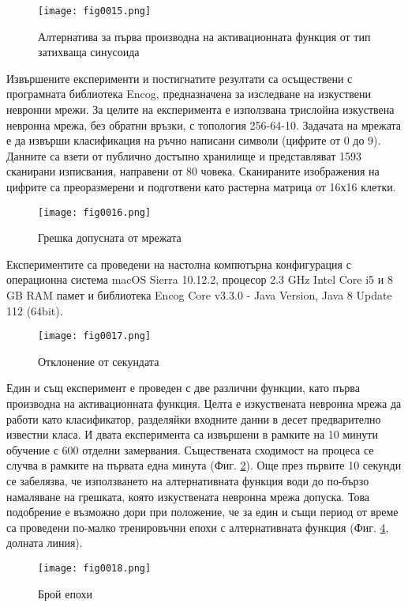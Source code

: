 \begin{figure}[H]
  \centering
  \texttt{[image: fig0015.png]}
  \caption{Алтернатива за първа производна на активационната функция от тип затихваща синусоида}
\label{fig0015}
\end{figure}

Извършените експерименти и постигнатите резултати са осъществени с програмната библиотека Encog, предназначена за изследване на изкуствени невронни мрежи. За целите на експеримента е използвана трислойна изкуствена невронна мрежа, без обратни връзки, с топология 256-64-10. Задачата на мрежата е да извърши класификация на ръчно написани символи (цифрите от 0 до 9). Данните са взети от публично достъпно хранилище и представляват 1593 сканирани изписвания, направени от 80 човека. Сканираните изображения на цифрите са преоразмерени и подготвени като растерна матрица от 16х16 клетки.

\begin{figure}[H]
  \centering
  \texttt{[image: fig0016.png]}
  \caption{Грешка допусната от мрежата}
\label{fig0016}
\end{figure}

Експериментите са проведени на настолна компютърна конфигурация с операционна система macOS Sierra 10.12.2, процесор 2.3 GHz Intel Core i5 и 8 GB RAM памет и библиотека Encog Core v3.3.0 - Java Version, Java 8 Update 112 (64bit).

\begin{figure}[H]
  \centering
  \texttt{[image: fig0017.png]}
  \caption{Отклонение от секундата}
\label{fig0017}
\end{figure}

Един и същ експеримент е проведен с две различни функции, като първа производна на активационната функция. Целта е изкуствената невронна мрежа да работи като класификатор, разделяйки входните данни в десет предварително известни класа. И двата експеримента са извършени в рамките на 10 минути обучение с 600 отделни замервания. Съществената сходимост на процеса се случва в рамките на първата една минута (Фиг. \ref{fig0016}). Още през първите 10 секунди се забелязва, че използването на алтернативната функция води до по-бързо намаляване на грешката, която изкуствената невронна мрежа допуска. Това подобрение е възможно дори при положение, че за един и същи период от време са проведени по-малко тренировъчни епохи с алтернативната функция (Фиг. \ref{fig0018}, долната линия).

\begin{figure}[H]
  \centering
  \texttt{[image: fig0018.png]}
  \caption{Брой епохи}
\label{fig0018}
\end{figure}

